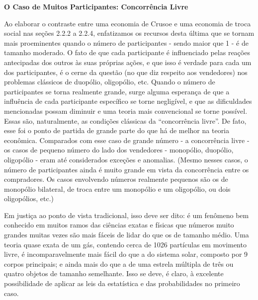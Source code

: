 \documentclass[a4paper,12pt]{article}[abntex2]
\begin{document}
\textbf{O Caso de Muitos Participantes: Concorrência Livre}

Ao elaborar o contraste entre uma economia de Crusoe e uma economia de troca social nas seções 2.2.2 a 2.2.4, enfatizamos os recursos desta última que se tornam mais proeminentes quando o número de participantes - sendo maior que 1 - é de tamanho moderado. O fato de que cada participante é influenciado pelas reações antecipadas dos outros às suas próprias ações, e que isso é verdade para cada um dos participantes, é o cerne da questão (no que diz respeito aos vendedores) nos problemas clássicos de duopólio, oligopólio, etc. Quando o número de participantes se torna realmente grande, surge alguma esperança de que a influência de cada participante específico se torne negligível, e que as dificuldades mencionadas possam diminuir e uma teoria mais convencional se torne possível. Essas são, naturalmente, as condições clássicas da “concorrência livre”. De fato, esse foi o ponto de partida de grande parte do que há de melhor na teoria econômica. Comparados com esse caso de grande número - a concorrência livre - os casos de pequeno número do lado dos vendedores - monopólio, duopólio, oligopólio - eram até considerados exceções e anomalias. (Mesmo nesses casos, o número de participantes ainda é muito grande em vista da concorrência entre os compradores. Os casos envolvendo números realmente pequenos são os de monopólio bilateral, de troca entre um monopólio e um oligopólio, ou dois oligopólios, etc.)

Em justiça ao ponto de vista tradicional, isso deve ser dito: é um fenômeno bem conhecido em muitos ramos das ciências exatas e físicas que números muito grandes muitas vezes são mais fáceis de lidar do que os de tamanho médio. Uma teoria quase exata de um gás, contendo cerca de 1026 partículas em movimento livre, é incomparavelmente mais fácil do que a do sistema solar, composto por 9 corpos principais; e ainda mais do que a de uma estrela múltipla de três ou quatro objetos de tamanho semelhante. Isso se deve, é claro, à excelente possibilidade de aplicar as leis da estatística e das probabilidades no primeiro caso.
\end{document}
